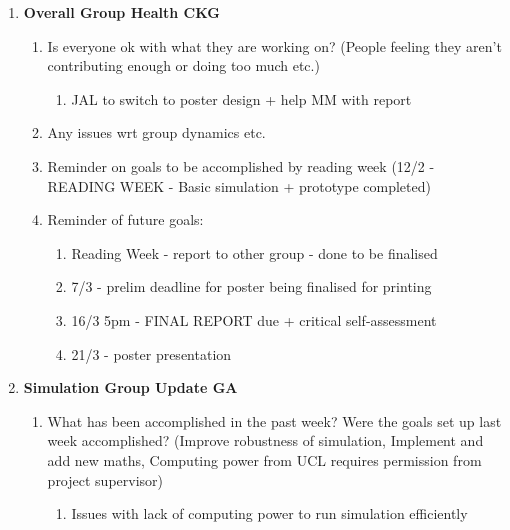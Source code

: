 \begin{enumerate}
\item  \textbf{Overall Group Health CKG}

\begin{enumerate}
\item Is everyone ok with what they are working on? (People feeling they aren't contributing enough or doing too much etc.)

\begin{enumerate}
\item  JAL to switch to poster design + help MM with report
\end{enumerate}

\item  Any issues wrt group dynamics etc.

\item  Reminder on goals to be accomplished by reading week (12/2 - READING WEEK - Basic simulation + prototype completed)

\item  Reminder of future goals:

\begin{enumerate}
\item  Reading Week - report to other group - done to be finalised

\item  7/3 - prelim deadline for poster being finalised for printing

\item  16/3 5pm - FINAL REPORT due + critical self-assessment

\item  21/3 - poster presentation
\end{enumerate}


\end{enumerate}

\item  \textbf{Simulation Group Update GA}

\begin{enumerate}
\item What has been accomplished in the past week? Were the goals set up last week accomplished? (Improve robustness of simulation, Implement and add new maths, Computing power from UCL requires permission from project supervisor)

\begin{enumerate}
\item  Issues with lack of computing power to run simulation efficiently


\end{enumerate}
\end{enumerate}
\end{enumerate}
